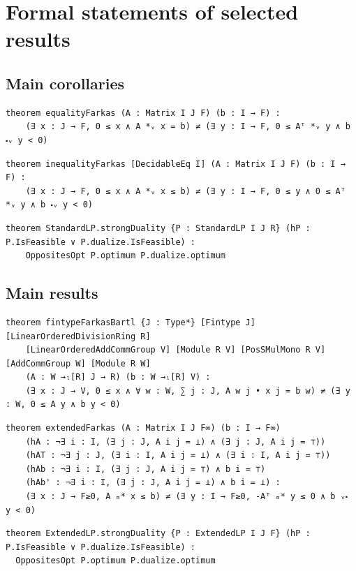 \documentclass[]{article}
\renewcommand{\.}{\hskip .75pt}
\begin{document}
\section{Formal statements of selected results}
\label{statements}

\subsection{Main corollaries}

\begin{lstlisting}
theorem equalityFarkas (A : Matrix I J F) (b : I → F) :
    (∃ x : J → F, 0 ≤ x ∧ A *ᵥ x = b) ≠ (∃ y : I → F, 0 ≤ Aᵀ *ᵥ y ∧ b ⬝ᵥ y < 0)
\end{lstlisting}
\begin{lstlisting}
theorem inequalityFarkas [DecidableEq I] (A : Matrix I J F) (b : I → F) :
    (∃ x : J → F, 0 ≤ x ∧ A *ᵥ x ≤ b) ≠ (∃ y : I → F, 0 ≤ y ∧ 0 ≤ Aᵀ *ᵥ y ∧ b ⬝ᵥ y < 0)
\end{lstlisting}
\begin{lstlisting}
theorem StandardLP.strongDuality {P : StandardLP I J R} (hP : P.IsFeasible ∨ P.dualize.IsFeasible) :
    OppositesOpt P.optimum P.dualize.optimum
\end{lstlisting}

\subsection{Main results}

\begin{lstlisting}
theorem fintypeFarkasBartl {J : Type*} [Fintype J] [LinearOrderedDivisionRing R]
    [LinearOrderedAddCommGroup V] [Module R V] [PosSMulMono R V] [AddCommGroup W] [Module R W]
    (A : W →ₗ[R] J → R) (b : W →ₗ[R] V) :
    (∃ x : J → V, 0 ≤ x ∧ ∀ w : W, ∑ j : J, A w j • x j = b w) ≠ (∃ y : W, 0 ≤ A y ∧ b y < 0)
\end{lstlisting}
\begin{lstlisting}
theorem extendedFarkas (A : Matrix I J F∞) (b : I → F∞)
    (hA : ¬∃ i : I, (∃ j : J, A i j = ⊥) ∧ (∃ j : J, A i j = ⊤))
    (hAT : ¬∃ j : J, (∃ i : I, A i j = ⊥) ∧ (∃ i : I, A i j = ⊤))
    (hAb : ¬∃ i : I, (∃ j : J, A i j = ⊤) ∧ b i = ⊤)
    (hAb' : ¬∃ i : I, (∃ j : J, A i j = ⊥) ∧ b i = ⊥) :
    (∃ x : J → F≥0, A ₘ* x ≤ b) ≠ (∃ y : I → F≥0, -Aᵀ ₘ* y ≤ 0 ∧ b ᵥ⬝ y < 0)
\end{lstlisting}
\begin{lstlisting}
theorem ExtendedLP.strongDuality {P : ExtendedLP I J F} (hP : P.IsFeasible ∨ P.dualize.IsFeasible) :
  OppositesOpt P.optimum P.dualize.optimum
\end{lstlisting}
\end{document}
